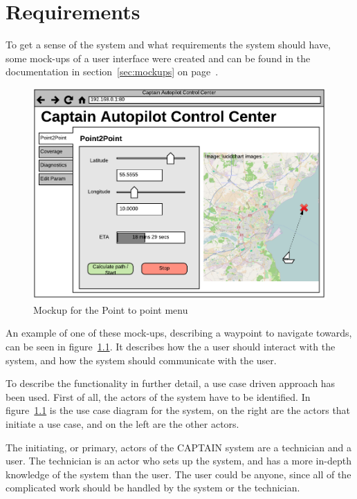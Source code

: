 \chapter{Requirements}
To get a sense of the system and what requirements the system should have, some mock-ups of a user interface were created and can be found in the documentation in section~\ref{sec:mockups} on page~\pageref{sec:mockups}.

\begin{figure}[H]
\centering
\includegraphics[width=0.7\linewidth]{../Appendix/Project/Dokumentation/Images/Requirements_specification/UI_Mockup_Point_to_point}
\caption{Mockup for the Point to point menu}
\label{fig:uimockuppointtopoint}
\end{figure}

An example of one of these mock-ups, describing a waypoint to navigate towards, can be seen in figure~\ref{fig:uimockuppointtopoint}. It describes how the a user should interact with the system, and how the system should communicate with the user.

To describe the functionality in further detail, a use case driven approach has been used. First of all, the actors of the system have to be identified. In figure~\ref{fig:uimockuppointtopoint} is the use case diagram for the system, on the right are the actors that initiate a use case, and on the left are the other actors.

The initiating, or primary, actors of the CAPTAIN system are a technician and a user. The technician is an actor who sets up the system, and has a more in-depth knowledge of the system than the user. The user could be anyone, since all of the complicated work should be handled by the system or the technician. 

